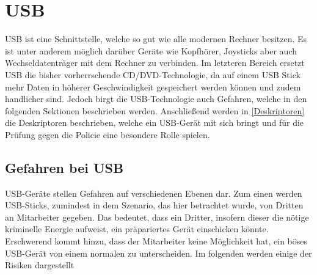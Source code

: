 \chapter{USB}
USB ist eine Schnittstelle, welche so gut wie alle modernen Rechner besitzen. Es ist unter anderem möglich darüber Geräte wie Kopfhörer, Joysticks aber auch Wechseldatenträger mit dem Rechner zu verbinden. Im letzteren Bereich ersetzt USB die bisher vorherrschende CD/DVD-Technologie, da auf einem USB Stick mehr Daten in höherer Geschwindigkeit gespeichert werden können und zudem handlicher sind. Jedoch birgt die USB-Technologie auch Gefahren, welche in den folgenden Sektionen beschrieben werden. Anschließend werden in \ref{Deskriptoren} die Deskriptoren beschrieben, welche ein USB-Gerät mit sich bringt und für die Prüfung gegen die Policie eine besondere Rolle spielen.

\section{Gefahren bei USB}\label{GefBeiUSB}
USB-Geräte stellen Gefahren auf verschiedenen Ebenen dar. Zum einen werden USB-Sticks, zumindest in dem Szenario, das hier betrachtet wurde, von Dritten an Mitarbeiter gegeben. Das bedeutet, dass ein Dritter, insofern dieser die nötige kriminelle Energie aufweist, ein präpariertes Gerät einschicken könnte. Erschwerend kommt hinzu, dass der Mitarbeiter keine Möglichkeit hat, ein böses USB-Gerät von einem normalen zu unterscheiden. Im folgenden werden einige der Risiken dargestellt

